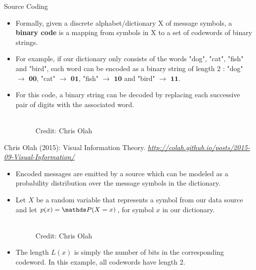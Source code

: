 \begin{vbframe} {Source Coding}
\begin{itemize}
  \item Formally, given a discrete alphabet/dictionary X of message symbols, a \textbf{binary code} is a mapping
from symbols in X to a set of codewords of binary strings.
 \item For example, if our dictionary only consists of the words "dog", "cat", "fish" and "bird", each word can be encoded as a binary string of length 2 : "dog" $\rightarrow$ $\mathbf{00}$, "cat" $\rightarrow$ $\mathbf{01}$, "fish" $\rightarrow$ $\mathbf{10}$ and "bird" $\rightarrow$ $\mathbf{11}$.
 \item For this code, a binary string can be decoded by replacing each successive pair of digits with the associated word.
\begin{figure}
    \centering
      \tiny{\\ Credit: Chris Olah\\}
  \end{figure}
\end{itemize}
 {\tiny{Chris Olah (2015): Visual Information Theory. \emph{\url{http://colah.github.io/posts/2015-09-Visual-Information/}}}\par}
\framebreak

\begin{itemize}
  \item Encoded messages are emitted by a source which can be modeled as a probability distribution over the message symbols in the dictionary. 
  \item Let $X$ be a random variable that represents a symbol from our data source and let $p(x) = \P(X = x)$, for symbol $x$ in our dictionary.
  \begin{figure}
    \centering
      \tiny{\\ Credit: Chris Olah}
  \end{figure}
  \item The length $L(x)$ is simply the number of bits in the corresponding codeword. In this example, all codewords have length 2.
\end{itemize}
\framebreak


\end{vbframe}
